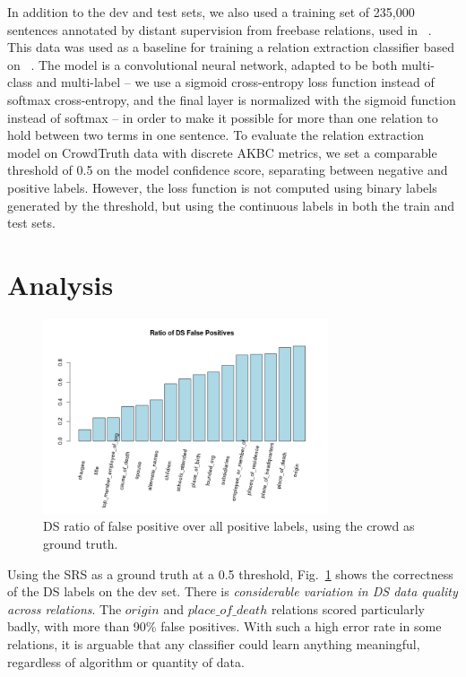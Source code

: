 In addition to the dev and test sets, we also used a training set of 235,000 sentences annotated by distant supervision from freebase relations, used in ~\cite{riedel2013universalschema}.  This data was used as a baseline for training a relation extraction classifier based on ~\cite{nguyen2015relation}.  The model is a convolutional neural network, adapted to be both multi-class and multi-label -- we use a sigmoid cross-entropy loss function instead of softmax cross-entropy, and the final layer is normalized with the sigmoid function instead of softmax -- in order to make it possible for more than one relation to hold between two terms in one sentence.
To evaluate the relation extraction model on CrowdTruth data with discrete AKBC metrics, we set a comparable threshold of 0.5 on the model confidence score, separating between negative and positive labels. However, the loss function is not computed using binary labels generated by the threshold, but using the continuous labels in both the train and test sets.

\section{Analysis}

\begin{figure}[htb!]
\centering
\includegraphics[width=0.75\textwidth]{img/fp_ratio.png}
\caption{DS ratio of false positive over all positive labels, using the crowd as ground truth.}
\label{fig:fp_rate}
\end{figure}

Using the SRS as a ground truth at a 0.5 threshold, Fig.~\ref{fig:fp_rate} shows the correctness of the DS labels on the dev set.  There is \textit{considerable variation in DS data quality across relations}. The $origin$ and $place\_of\_death$ relations scored particularly badly, with more than 90\% false positives. With such a high error rate in some relations, it is arguable that any classifier could learn anything meaningful, regardless of algorithm or quantity of data.

